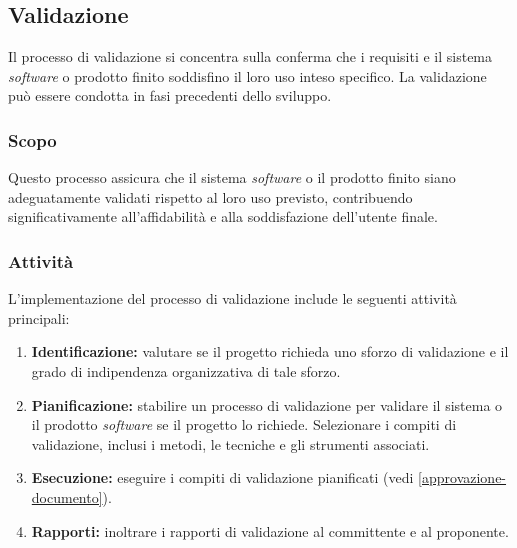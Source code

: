 \subsection{Validazione}

Il processo di validazione si concentra sulla conferma che i requisiti e il
sistema \textit{software} o prodotto finito soddisfino il loro uso inteso
specifico. La validazione può essere condotta in fasi precedenti dello sviluppo.

\subsubsection{Scopo}

Questo processo assicura che il sistema \textit{software} o il prodotto finito
siano adeguatamente validati rispetto al loro uso previsto, contribuendo
significativamente all'affidabilità e alla soddisfazione dell'utente finale.

\subsubsection{Attività}
L'implementazione del processo di validazione include le seguenti attività
principali:

\begin{enumerate}
	\item \textbf{Identificazione:} valutare se il progetto richieda uno sforzo
	      di validazione e il grado di indipendenza organizzativa di tale
	      sforzo.
	\item \textbf{Pianificazione:} stabilire un processo di validazione per
	      validare il sistema o il prodotto \textit{software} se il progetto lo
	      richiede. Selezionare i compiti di validazione, inclusi i metodi, le
	      tecniche e gli strumenti associati.
	\item \textbf{Esecuzione:} eseguire i compiti di validazione pianificati
	      (vedi \autoref{approvazione-documento}).
	\item \textbf{Rapporti:} inoltrare i rapporti di validazione al committente
	      e al proponente.
\end{enumerate}
